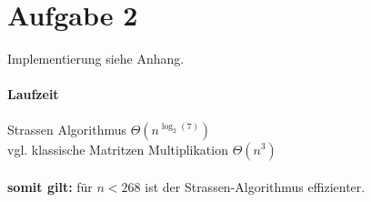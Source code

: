 \section*{Aufgabe 2}
Implementierung  siehe Anhang.
\paragraph{Laufzeit} Strassen Algorithmus $\Theta(n^{\log_2(7)})$ \\
vgl. klassische Matritzen Multiplikation $\Theta(n^{3})$ \\~\\
\textbf{somit gilt:} für $n < 268$ ist der Strassen-Algorithmus effizienter.